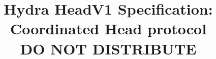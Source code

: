 \documentclass[11pt]{article}
\begin{document}
\date{}

\title{\Large \textbf{Hydra HeadV1 Specification: Coordinated Head protocol}\\[2ex] DO NOT DISTRIBUTE}

\author{}

\maketitle












\end{document}
